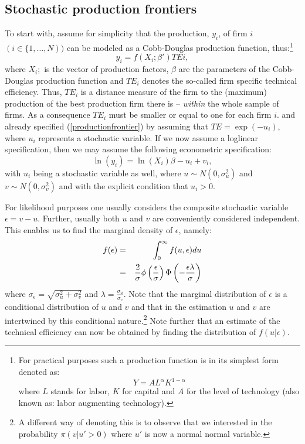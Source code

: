\documentclass[11pt,parskip,abstracton,notitlepage]{scrartcl}
\begin{document}
\subsection{Stochastic production frontiers}\label{sub:spf}
%
To start with, assume for simplicity that the production, $y_i$, of firm $i$ $(i \in \{1,\ldots,N))$ can be modeled as a Cobb-Douglas production function, thus:\footnote{For practical purposes such a production function is in its simplest form denoted as:\begin{equation*} Y = AL^\alpha K^{1-\alpha}\end{equation*} where $L$ stands for labor, $K$ for capital and $A$ for the level of technology (also known as: labor augmenting technology).} 
%
\begin{equation}
y_i = f(X_i;\beta'){TE}{i},
\label{productionfrontier}
\end{equation}
%
where $X_i;$ is the vector of production factors, $\beta$ are the parameters of the Cobb-Douglas production function and ${TE}_i$ denotes the so-called firm specific technical efficiency. Thus, ${TE}_i$ is a distance measure of the firm to the (maximum) production of the best production firm there is -- \emph{within} the whole sample of firms. As a consequence ${TE}_i$ must be smaller or equal to one for each firm $i$.
%
\citet{AIGNER1977} and \citet{MEEUSEN1977} already specified (\ref{productionfrontier}) by assuming that $TE = \exp(-u_i)$, where $u_i$ represents a stochastic variable. If we now assume a loglinear specification, then we may assume the following econometric specification:
%
\begin{equation}
\ln \left(y_i\right) = \ln({X}_i) \beta - u_i + v_i,
\label{specification}
\end{equation}
%
with $u_i$ being a stochastic variable as well, where $u\sim N(0,\sigma^2_u)$ and $v \sim N(0,\sigma^2_v)$ and with the explicit condition that $u_i > 0$. 

For likelihood purposes one usually considers the composite stochastic variable $\epsilon = v-u$. Further, usually both $u$ and $v$ are conveniently considered independent. This enables us to find the marginal density of $\epsilon$, namely:
%
\begin{eqnarray}
f(\epsilon)	&=& \int_0^\infty f(u, \epsilon)du \notag\\
						&=& \frac{2}{\sigma}\phi\left(\frac{\epsilon}{\sigma}\right)\Phi\left(-\frac{\epsilon\lambda}{\sigma}\right)
\label{likelihood}
\end{eqnarray}
%
where $\sigma_\epsilon = \sqrt{\sigma_u^2 + \sigma_v^2}$ and $\lambda = \frac{\sigma_u}{\sigma_v}$. Note that the marginal distribution of $\epsilon$ is a conditional distribution of $u$ and $v$ and that in the estimation $u$ and $v$ are intertwined by this conditional nature.\footnote{A different way of denoting this is to observe that we interested in the probability $\pi(v|u'>0)$ where $u'$ is now a normal normal variable.} Note further that an estimate of the technical efficiency can now be obtained by finding the distribution of $f(u|\epsilon)$. 
\end{document}
